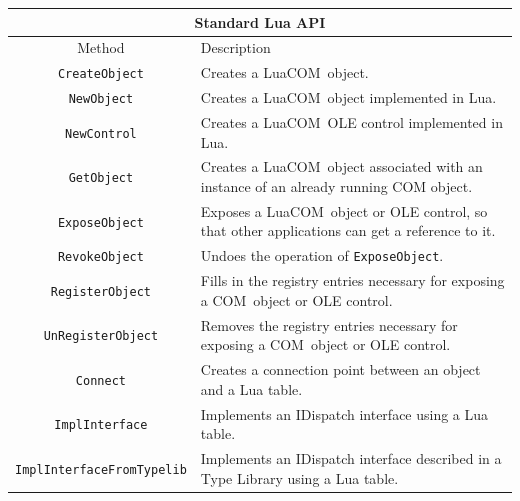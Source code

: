\documentclass[11pt,a4paper,english]{report}
\newcommand{\ttext}[1]{#1}
\newcommand{\ttitle}[1]{#1}
\newcommand{\tlinetitB}[2]{#1 & #2 \\ \hline \hline}
\newcommand{\ttext}[1]{{\raggedright #1 \\}}
\newcommand{\ttitle}[1]{\begin{minipage}{\colA cm} \centering \bf #1 \end{minipage}}
\newcommand{\tlinetitB}[2]{\ttitle{#1} & \ttitle{#2} \\ \hline \hline}
\newcommand{\techname}[1]{\mbox{#1}}
\newcommand{\com}{\techname{COM}}
\newcommand{\luacom}{\techname{LuaCOM}}
\begin{document}
  \newcommand{\colA}{6}


  \begin{center}
  \begin{tabular}{|c|p{7cm}|}

  \multicolumn{2}{c}{\large Standard Lua API} \\
  \hline

  \tlinetitB{Method}{Description}

  \verb+CreateObject+
    & \ttext{Creates a \luacom\ object.} \\ \hline

  \verb+NewObject+
    & \ttext{Creates a \luacom\ object implemented in Lua.} \\ \hline

  \verb+NewControl+
    & \ttext{Creates a \luacom\ OLE control implemented in Lua.} \\ \hline

  \verb+GetObject+
    & \ttext{Creates a \luacom\ object associated with an
    instance of an already running COM object.} \\ \hline

  \verb+ExposeObject+ & \ttext{Exposes a \luacom\ object or OLE control, so
    that other applications can get a reference to it.} \\ \hline

  \verb+RevokeObject+
    & \ttext{Undoes the operation of \texttt{ExposeObject}.} \\ \hline

  \verb+RegisterObject+
    & \ttext{Fills in the registry entries necessary for exposing a
    \com\ object or OLE control.} \\ \hline

  \verb+UnRegisterObject+
    & \ttext{Removes the registry entries necessary for exposing a
    \com\ object or OLE control.} \\ \hline

  \verb+Connect+
    & \ttext{Creates a connection point between an object and a Lua table.} \\ \hline

  \verb+ImplInterface+ & \ttext{Implements an IDispatch
    interface using a Lua table.} \\ \hline

  \verb+ImplInterfaceFromTypelib+ & \ttext{Implements an
    IDispatch interface described in a Type Library using a Lua table.}
    \\ \hline


\end{tabular}
\end{center}
\end{document}

